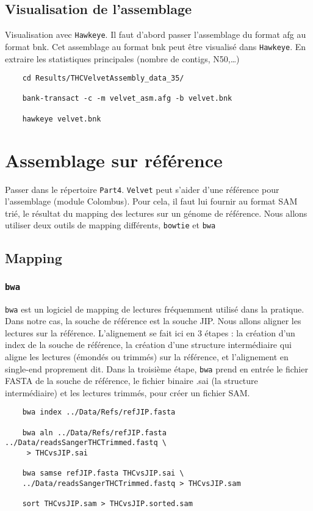 \documentclass[a4paper,12pt]{article}
\begin{document}
\subsection{Visualisation de l'assemblage}

Visualisation avec \verb=Hawkeye=. Il faut d'abord passer l'assemblage du format afg au format bnk. Cet assemblage au format bnk peut être visualisé dans \verb=Hawkeye=. En extraire les statistiques principales (nombre de contigs, N50,\ldots) 
\begin{lstlisting}	
	cd Results/THCVelvetAssembly_data_35/
	
	bank-transact -c -m velvet_asm.afg -b velvet.bnk

	hawkeye velvet.bnk
\end{lstlisting}


\section{Assemblage sur référence}
\label{sec:assr}

Passer dans le répertoire \verb=Part4=. \verb=Velvet= peut s'aider d'une référence pour l'assemblage (module Colombus). Pour cela, il faut lui fournir au format SAM trié, le résultat du mapping des lectures sur un génome de référence. Nous allons utiliser deux outils de mapping différents, \verb=bowtie= et \verb=bwa=

\subsection{Mapping}

\subsubsection{\tt{bwa}}
{\tt bwa} est un logiciel de mapping de lectures fréquemment utilisé dans la pratique. Dans notre cas, la souche de référence est la souche JIP. Nous allons aligner les lectures sur la référence. L'alignement se fait ici en 3 étapes : la création d'un index de la souche de référence, la création d'une structure intermédiaire qui aligne les lectures (émondés ou trimmés) sur la référence, et l'alignement en single-end proprement dit. Dans la troisième étape, {\tt bwa} prend en entrée le fichier FASTA de la souche de référence, le fichier binaire .sai (la structure intermédiaire) et les lectures trimmés, pour créer un fichier SAM.

\begin{lstlisting}
	bwa index ../Data/Refs/refJIP.fasta

	bwa aln ../Data/Refs/refJIP.fasta ../Data/readsSangerTHCTrimmed.fastq \
	 > THCvsJIP.sai

	bwa samse refJIP.fasta THCvsJIP.sai \
	../Data/readsSangerTHCTrimmed.fastq > THCvsJIP.sam
	
	sort THCvsJIP.sam > THCvsJIP.sorted.sam
\end{lstlisting}
\end{document}
